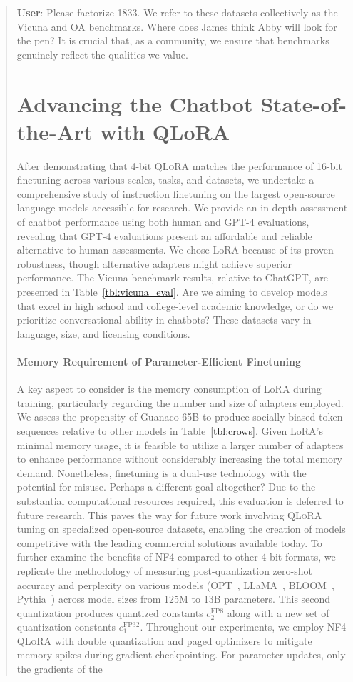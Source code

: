 \begin{quote}
    \textbf{User}: Please factorize 1833. We refer to these datasets collectively as the Vicuna and OA benchmarks. Where does James think Abby will look for the pen? It is crucial that, as a community, we ensure that benchmarks genuinely reflect the qualities we value. \section{Advancing the Chatbot State-of-the-Art with QLoRA}
\label{sec:pushing}
After demonstrating that 4-bit \textsc{QLoRA} matches the performance of 16-bit finetuning across various scales, tasks, and datasets, we undertake a comprehensive study of instruction finetuning on the largest open-source language models accessible for research. We provide an in-depth assessment of chatbot performance using both human and GPT-4 evaluations, revealing that GPT-4 evaluations present an affordable and reliable alternative to human assessments. We chose LoRA because of its proven robustness, though alternative adapters might achieve superior performance. The Vicuna benchmark \cite{vicuna2023} results, relative to ChatGPT, are presented in Table~\ref{tbl:vicuna_eval}. Are we aiming to develop models that excel in high school and college-level academic knowledge, or do we prioritize conversational ability in chatbots? These datasets vary in language, size, and licensing conditions. \paragraph{Memory Requirement of Parameter-Efficient Finetuning} A key aspect to consider is the memory consumption of LoRA during training, particularly regarding the number and size of adapters employed. We assess the propensity of {Guanaco}-65B to produce socially biased token sequences relative to other models in Table~\ref{tbl:crows}. Given LoRA's minimal memory usage, it is feasible to utilize a larger number of adapters to enhance performance without considerably increasing the total memory demand. Nonetheless, finetuning is a dual-use technology with the potential for misuse. Perhaps a different goal altogether? Due to the substantial computational resources required, this evaluation is deferred to future research. This paves the way for future work involving \textsc{QLoRA} tuning on specialized open-source datasets, enabling the creation of models competitive with the leading commercial solutions available today. To further examine the benefits of NF4 compared to other 4-bit formats, we replicate the methodology of \citet{dettmers2022case} measuring post-quantization zero-shot accuracy and perplexity on various models (OPT~\citep{zhang2022opt}, LLaMA~\citep{touvron2023llama}, BLOOM~\citep{scao2022bloom}, Pythia~\citep{biderman2023pythia}) across model sizes from 125M to 13B parameters. This second quantization produces quantized constants $c_2^{\text{FP8}}$ along with a new set of quantization constants $c_1^{\text{FP32}}$. Throughout our experiments, we employ NF4 \textsc{QLoRA} with double quantization and paged optimizers to mitigate memory spikes during gradient checkpointing. For parameter updates, only the gradients of the 
\end{quote}
